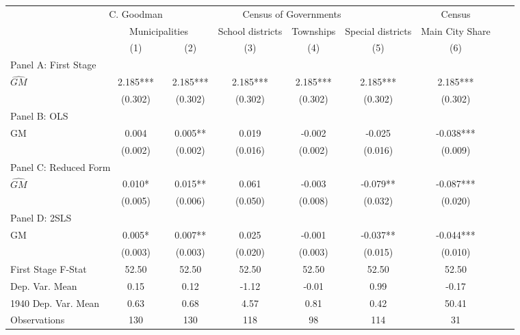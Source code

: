  \begin{tabular}{l*{8}{c}} \toprule
&\multicolumn{1}{c}{C. Goodman}&\multicolumn{4}{c}{Census of Governments}&\multicolumn{1}{c}{Census}\\\cmidrule(lr){2-2}\cmidrule(lr){3-6}\cmidrule(lr){7-7}
&\multicolumn{2}{c}{Municipalities}&\multicolumn{1}{c}{School districts}&\multicolumn{1}{c}{Townships}&\multicolumn{1}{c}{Special districts}&\multicolumn{1}{c}{Main City Share}\\\cmidrule(lr){2-3}\cmidrule(lr){4-6}\cmidrule(lr){7-7}
&\multicolumn{1}{c}{(1)}&\multicolumn{1}{c}{(2)}&\multicolumn{1}{c}{(3)}&\multicolumn{1}{c}{(4)}&\multicolumn{1}{c}{(5)}&\multicolumn{1}{c}{(6)}\\
\cmidrule(lr){1-7}
\multicolumn{6}{l}{Panel A: First Stage}\\
\cmidrule(lr){1-7}
$\widehat{GM}$  &    2.185***&    2.185***&    2.185***&    2.185***&    2.185***&    2.185***\\
                &  (0.302)   &  (0.302)   &  (0.302)   &  (0.302)   &  (0.302)   &  (0.302)   \\
\cmidrule(lr){1-7}
\multicolumn{6}{l}{Panel B: OLS}\\
\cmidrule(lr){1-7}
GM              &    0.004   &    0.005** &    0.019   &   -0.002   &   -0.025   &   -0.038***\\
                &  (0.002)   &  (0.002)   &  (0.016)   &  (0.002)   &  (0.016)   &  (0.009)   \\
\cmidrule(lr){1-7}
\multicolumn{6}{l}{Panel C: Reduced Form}\\
\cmidrule(lr){1-7}
$\widehat{GM}$  &    0.010*  &    0.015** &    0.061   &   -0.003   &   -0.079** &   -0.087***\\
                &  (0.005)   &  (0.006)   &  (0.050)   &  (0.008)   &  (0.032)   &  (0.020)   \\
\cmidrule(lr){1-7}
\multicolumn{6}{l}{Panel D: 2SLS}\\
\cmidrule(lr){1-7}
GM              &    0.005*  &    0.007** &    0.025   &   -0.001   &   -0.037** &   -0.044***\\
                &  (0.003)   &  (0.003)   &  (0.020)   &  (0.003)   &  (0.015)   &  (0.010)   \\
\midrule
First Stage F-Stat&    52.50   &    52.50   &    52.50   &    52.50   &    52.50   &    52.50   \\
Dep. Var. Mean  &     0.15   &     0.12   &    -1.12   &    -0.01   &     0.99   &    -0.17   \\
1940 Dep. Var. Mean&     0.63   &     0.68   &     4.57   &     0.81   &     0.42   &    50.41   \\
Observations    &      130   &      130   &      118   &       98   &      114   &       31   \\
       \bottomrule \end{tabular}
